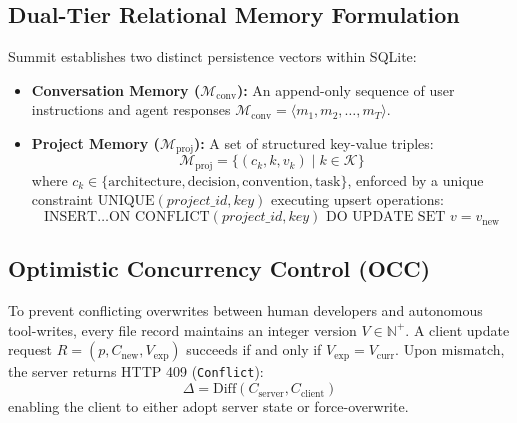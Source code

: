 \documentclass[conference]{IEEEtran}
\begin{document}
\subsection{Dual-Tier Relational Memory Formulation}
Summit establishes two distinct persistence vectors within SQLite:
\begin{itemize}
    \item \textbf{Conversation Memory ($\mathcal{M}_{\text{conv}}$):} An append-only sequence of user instructions and agent responses $\mathcal{M}_{\text{conv}} = \langle m_1, m_2, \dots, m_T \rangle$.
    \item \textbf{Project Memory ($\mathcal{M}_{\text{proj}}$):} A set of structured key-value triples:
    \begin{equation}
    \mathcal{M}_{\text{proj}} = \{ (c_k, k, v_k) \mid k \in \mathcal{K} \}
    \end{equation}
    where $c_k \in \{\text{architecture}, \text{decision}, \text{convention}, \text{task}\}$, enforced by a unique constraint $\text{UNIQUE}(project\_id, key)$ executing upsert operations:
    \begin{equation}
    \text{INSERT} \dots \text{ON CONFLICT}(project\_id, key) \text{ DO UPDATE SET } v = v_{\text{new}}
    \end{equation}
\end{itemize}

\subsection{Optimistic Concurrency Control (OCC)}
To prevent conflicting overwrites between human developers and autonomous tool-writes, every file record maintains an integer version $V \in \mathbb{N}^+$. A client update request $R = (p, C_{\text{new}}, V_{\text{exp}})$ succeeds if and only if $V_{\text{exp}} = V_{\text{curr}}$. Upon mismatch, the server returns HTTP 409 (\texttt{Conflict}):
\begin{equation}
\Delta = \text{Diff}(C_{\text{server}}, C_{\text{client}})
\end{equation}
enabling the client to either adopt server state or force-overwrite.
\end{document}
